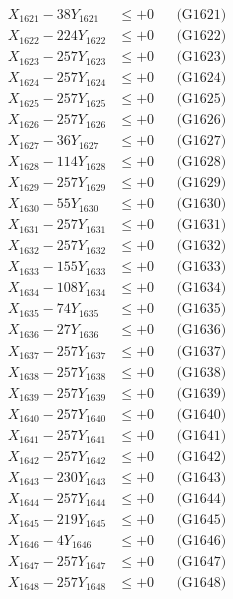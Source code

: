 \documentclass[a4paper,10pt]{article}
\begin{document}
{\begin{align}
\allowbreak
X_{1621} - 38Y_{1621} &\leq +0 && \text{(G1621)} \\
X_{1622} - 224Y_{1622} &\leq +0 && \text{(G1622)} \\
X_{1623} - 257Y_{1623} &\leq +0 && \text{(G1623)} \\
X_{1624} - 257Y_{1624} &\leq +0 && \text{(G1624)} \\
X_{1625} - 257Y_{1625} &\leq +0 && \text{(G1625)} \\
X_{1626} - 257Y_{1626} &\leq +0 && \text{(G1626)} \\
X_{1627} - 36Y_{1627} &\leq +0 && \text{(G1627)} \\
X_{1628} - 114Y_{1628} &\leq +0 && \text{(G1628)} \\
X_{1629} - 257Y_{1629} &\leq +0 && \text{(G1629)} \\
X_{1630} - 55Y_{1630} &\leq +0 && \text{(G1630)} \\
\allowbreak
X_{1631} - 257Y_{1631} &\leq +0 && \text{(G1631)} \\
X_{1632} - 257Y_{1632} &\leq +0 && \text{(G1632)} \\
X_{1633} - 155Y_{1633} &\leq +0 && \text{(G1633)} \\
X_{1634} - 108Y_{1634} &\leq +0 && \text{(G1634)} \\
X_{1635} - 74Y_{1635} &\leq +0 && \text{(G1635)} \\
X_{1636} - 27Y_{1636} &\leq +0 && \text{(G1636)} \\
X_{1637} - 257Y_{1637} &\leq +0 && \text{(G1637)} \\
X_{1638} - 257Y_{1638} &\leq +0 && \text{(G1638)} \\
X_{1639} - 257Y_{1639} &\leq +0 && \text{(G1639)} \\
X_{1640} - 257Y_{1640} &\leq +0 && \text{(G1640)} \\
\allowbreak
X_{1641} - 257Y_{1641} &\leq +0 && \text{(G1641)} \\
X_{1642} - 257Y_{1642} &\leq +0 && \text{(G1642)} \\
X_{1643} - 230Y_{1643} &\leq +0 && \text{(G1643)} \\
X_{1644} - 257Y_{1644} &\leq +0 && \text{(G1644)} \\
X_{1645} - 219Y_{1645} &\leq +0 && \text{(G1645)} \\
X_{1646} - 4Y_{1646} &\leq +0 && \text{(G1646)} \\
X_{1647} - 257Y_{1647} &\leq +0 && \text{(G1647)} \\
X_{1648} - 257Y_{1648} &\leq +0 && \text{(G1648)} \\

\end{align}}
\end{document}
